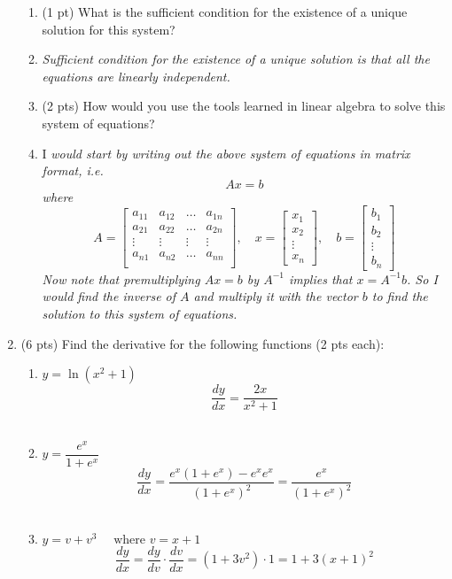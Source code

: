 \documentclass{./../../../Latex/tests}
\begin{document}
\begin{enumerate}
\begin{enumerate}
	\item (1 pt) What is the sufficient condition for the existence of a unique solution for this system? 
	\item [] \textit{Sufficient condition for the existence of a unique solution is that all the equations are linearly independent.} \\
	\item (2 pts) How would you use the tools learned in linear algebra to solve this system of equations? 
	\item [] I \textit{would start by writing out the above system of equations in matrix format, i.e. $$ Ax = b $$
	where }
$$
A = \begin{bmatrix}
a_{11} & a_{12} & \hdots & a_{1n} \\
a_{21} & a_{22} & \hdots & a_{2n} \\
\vdots & \vdots & \vdots & \vdots \\
a_{n1} & a_{n2} & \hdots & a_{nn} \\
\end{bmatrix}, \quad  
x = \begin{bmatrix} x_1 \\x_2 \\ \vdots \\x_n \end{bmatrix} , \quad  
b = \begin{bmatrix} b_1 \\b_2 \\ \vdots \\b_n \end{bmatrix} 
$$
\textit{Now note that premultiplying $Ax = b$ by $A^{-1}$ implies that $x=A^{-1}b$. So I would find the inverse of $A$ and multiply it with the vector $b$ to find the solution to this system of equations.
}\end{enumerate}

\newpage
\item (6 pts) Find the derivative for the following functions (2 pts each): \\
\begin{enumerate}
\item $y=\ln(x^2+1)$ \\ 
$$
\frac{d y}{d x}=\frac{2 x}{x^2+1}
$$ \\
\item $y=\dfrac{e^x}{1+e^x}$ \\ 
$$\frac{d y}{d x} =\frac{e^x\left(1+e^x\right)-e^x e^x}{\left(1+e^x\right)^2} =\frac{e^x}{\left(1+e^x\right)^2} $$ \\
\item $y=v+v^3 \quad \text{ where } v=x+1 $ \\ 
$$\frac{d y}{d x} =\frac{d y}{d v} \cdot \frac{d v}{d x} =\left(1+3 v^2\right) \cdot 1 =1+3(x+1)^2 $$
\end{enumerate}


\end{enumerate}
\end{document}
